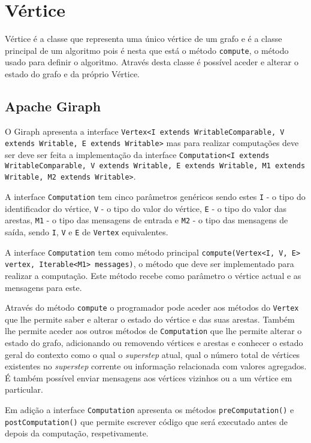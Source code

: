 \newpage
\section{Vértice}
Vértice é a classe que representa uma único vértice de um grafo e é a classe principal de um algoritmo pois é nesta que está o método \texttt{compute}, o método usado para definir o algoritmo. Através desta classe é possível aceder e alterar o estado do grafo e da próprio Vértice.
\subsection*{Apache Giraph}


O Giraph apresenta a interface \texttt{Vertex<I extends WritableComparable, V extends Writable, E extends Writable>} mas para realizar computações deve ser deve ser feita a implementação da interface \texttt{Computation<I extends WritableComparable, V extends Writable, E extends Writable, M1 extends Writable, M2 extends Writable>}.

A interface \texttt{Computation} tem cinco parâmetros genéricos sendo estes \texttt{I} - o tipo do identificador do vértice, \texttt{V} - o tipo do valor do vértice, \texttt{E} - o tipo do valor das arestas, \texttt{M1} - o tipo das mensagens de entrada e \texttt{M2} - o tipo das mensagens de saída, sendo \texttt{I}, \texttt{V} e \texttt{E} de \texttt{Vertex} equivalentes.

A interface \texttt{Computation} tem como método principal \texttt{compute(Vertex<I, V, E> vertex, Iterable<M1> messages)}, o método que deve ser implementado para realizar a computação. Este método recebe como parâmetro o vértice actual e as mensagens para este.

Através do método \texttt{compute} o programador pode aceder aos métodos do \texttt{Vertex} que lhe permite saber e alterar o estado do vértice e das suas arestas. Também lhe permite aceder aos outros métodos de \texttt{Computation} que lhe permite alterar o estado do grafo, adicionando ou removendo vértices e arestas e conhecer o estado geral do contexto como o qual o \textit{superstep} atual, qual o número total de vértices existentes no \textit{superstep} corrente ou informação relacionada com valores agregados. É também possível enviar mensagens aos vértices vizinhos ou a um vértice em particular.

Em adição a interface \texttt{Computation} apresenta os métodos \texttt{preComputation()} e \texttt{postComputation()} que permite escrever código que será executado antes de depois da computação, respetivamente.

